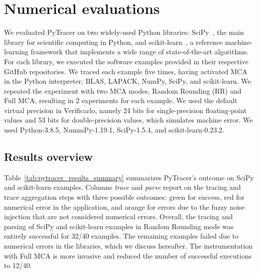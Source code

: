 \documentclass[11pt]{article}
\newcommand{\tristan}[1]{\color{orange}\textbf{From Tristan:} #1\color{black}\xspace}
\newcommand{\pytracer}[0]{PyTracer\xspace}
\begin{document}
\section{Numerical evaluations}

We evaluated \pytracer on two widely-used Python libraries: SciPy~\cite{virtanen2020scipy}, the main library for scientific computing in Python, and  scikit-learn~\cite{pedregosa2011scikit}, a reference machine-learning framework that
 implements a wide range of state-of-the-art algorithms. For each library, we executed the software examples provided in their respective GitHub repositories. We traced each example five times, having activated MCA in the Python interpreter, BLAS, LAPACK, NumPy, SciPy, and scikit-learn. We repeated the experiment with two MCA modes, Random Rounding (RR) and Full MCA, resulting in 2 experiments for each example. We used the default virtual precision in Verificarlo, namely 24 bits for single-precision floating-point values and 53 bits for double-precision values, which simulates machine error. We used Python-3.8.5, NummPy-1.19.1, SciPy-1.5.4, and scikit-learn-0.23.2.

\subsection{Results overview}

Table~\ref{tab:pytracer_results_summary} summarizes
\pytracer's outcome on SciPy and scikit-learn examples.
Columns \textit{trace} and \textit{parse} report on the tracing and trace aggregation steps with three possible outcomes: green for success, red for numerical error in the application, and orange for errors due to the fuzzy noise injection
that are not considered numerical errors.
Overall, the tracing and parsing of SciPy and scikit-learn examples in Random Rounding mode was entirely successful for 32/40 examples. The remaining examples failed due to numerical errors in the libraries, which we discuss hereafter. The instrumentation with Full MCA is more invasive and reduced the number of successful executions to 12/40.
\end{document}
